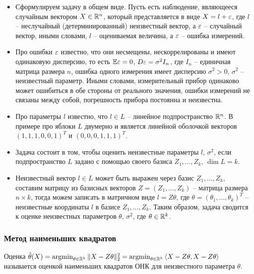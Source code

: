 \begin{itemize}
    \item Сформулируем задачу в общем виде. Пусть есть наблюдение, являющееся случайным вектором $X \in \mathbb{R}^n$, который представляется в виде $X = l + \varepsilon$, где $l$ -- неслучайный (детерминированный) неизвестный вектор, а $\varepsilon$ -- случайный вектор, иными словами, $l$ -- оцениваемая величина, а $\varepsilon$ -- ошибка измерений.

    \item Про ошибки $\varepsilon$ известно, что они несмещены, нескоррелированы и имеют одинаковую дисперсию, то есть $\mathbb{E} \varepsilon = 0$, $D \varepsilon = \sigma^2 I_n$, где $I_n$ -- единичная матрица размера $n$, ошибка одного измерения имеет дисперсию $\sigma^2 > 0$, $\sigma^2$ -- неизвестный параметр. Иными словами, измерительный прибор одинаково может ошибиться в обе стороны от реального значения, ошибки измерений не связаны между собой, погрешность прибора постоянна и неизвестна.

    \item Про параметры $l$ известно, что $l \in L$ -- линейное подпространство $\mathbb{R}^n$. В примере про яблоки $L$ двумерно и является линейной оболочкой векторов $(1, 1, 1, 0, 0, 1)^T$ и $(0, 0, 0, 1, 1, 1)^T$.

    \item Задача состоит в том, чтобы оценить неизвестные параметры $l$, $\sigma^2$, если подпространство $L$ задано с помощью своего базиса $Z_1, \dots, Z_k$, $\dim L = k$.

    \item Неизвестный вектор $l \in L$ может быть выражен через базис $Z_1, \dots, Z_k$, составим матрицу из базисных векторов $Z = (Z_1, \dots, Z_k)$ -- матрица размера $n \times k$, тогда можем записать в матричном виде $l = Z \theta$, где $\theta = (\theta_1, \dots, \theta_k)^T$ -- неизвестные координаты $l$ в базисе $Z_1, \dots, Z_k$. Таким образом, задача сводится к оценке неизвестных параметров $\theta$, $\sigma^2$, где $\theta \in \mathbb{R}^k$.
\end{itemize}

\subsubsection{Метод наименьших квадратов}

\begin{definition}
    Оценка $\hat{\theta}(X) = \operatorname{argmin}_{\theta \in \mathbb{R}^k} \|X - Z\theta\|^2_2 = \operatorname{argmin}_{\theta \in \mathbb{R}^k} \left\langle X - Z\theta, X - Z\theta\right\rangle$ называется оценкой наименьших квадратов ОНК для неизвестного параметра $\theta$.
\end{definition}


